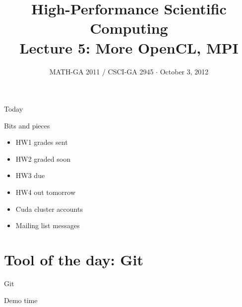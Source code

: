 \documentclass[english,compress]{beamer}
\begin{document}

\title{High-Performance Scientific Computing\\Lecture 5: More OpenCL, MPI}

\date{MATH-GA 2011 / CSCI-GA 2945 $\cdot$ October 3, 2012}

\frame{\titlepage}

\begin{frame}{Today}
  \tableofcontents[hideallsubsections]
\end{frame}
\begin{frame}{Bits and pieces}
  \begin{itemize}
    \item HW1 grades sent
    \item HW2 graded soon
    \item HW3 due
    \item HW4 out tomorrow
    \item Cuda cluster accounts
    \item Mailing list messages
  \end{itemize}
\end{frame}
\section{Tool of the day: Git}
\begin{frame}{Git}
  \begin{center}
  \Huge Demo time
  \end{center}
\end{frame}
\end{document}
